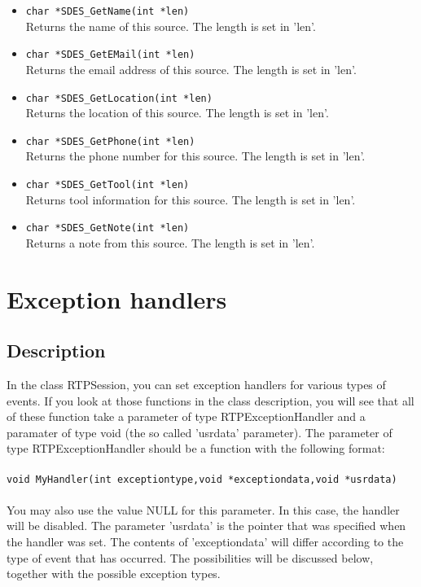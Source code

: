 \begin{itemize}
\item {\tt char *SDES\_GetName(int *len)}\\
	Returns the name of this source. The length is set in 'len'.

\item {\tt char *SDES\_GetEMail(int *len)}\\
	Returns the email address of this source. The length is set in 'len'.

\item {\tt char *SDES\_GetLocation(int *len)}\\
	Returns the location of this source. The length is set in 'len'.

\item {\tt char *SDES\_GetPhone(int *len)}\\
	Returns the phone number for this source. The length is set in 'len'.

\item {\tt char *SDES\_GetTool(int *len)}\\
	Returns tool information for this source. The length is set in 'len'.

\item {\tt char *SDES\_GetNote(int *len)}\\
	Returns a note from this source. The length is set in 'len'.

\end{itemize}


\section{Exception handlers}

\subsection{Description}

In the class RTPSession, you can set exception handlers for various types
of events. If you look at those functions in the class description, you will
see that all of these function take a parameter of type RTPExceptionHandler
and a paramater of type void (the so called 'usrdata' parameter). The
parameter of type RTPExceptionHandler should be a function with the following
format:\\
\\
{\tt void MyHandler(int exceptiontype,void *exceptiondata,void *usrdata)}\\
\\
You may also use the value NULL for this parameter. In this case, the handler
will be disabled. The parameter 'usrdata' is the pointer that was specified
when the handler was set. The contents of 'exceptiondata' will differ
according to the type of event that has occurred. The possibilities will
be discussed below, together with the possible exception types.

